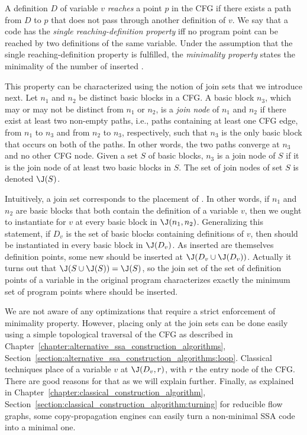 A definition $D$ of variable $v$ \emph{reaches} a point $p$ in the CFG
if there exists a path from $D$ to $p$ that does not pass through another
definition of $v$. We say that a code has the \emph{single reaching-definition property} iff no program point can be reached by two definitions of the same variable. 
Under the assumption that the single reaching-definition property is fulfilled, the \emph{minimality property} states the minimality of the number of inserted \phifuns.

This property can be characterized using the notion of join sets that we introduce next.
Let $n_{1}$ and $n_{2}$ be distinct basic blocks in a CFG. A basic block
$n_{3}$, which may or may not be distinct from $n_{1}$ or $n_{2}$, is 
a \emph{join node} of $n_{1}$ and $n_{2}$ if there exist at least two
non-empty paths, i.e., paths containing at least one CFG edge, from 
$n_{1}$ to $n_{3}$ and from $n_{2}$ to $n_{3}$, respectively, such that
$n_{3}$ is the only basic block that occurs on both of the paths. In
other words, the two paths converge at $n_{3}$ and no other CFG node. 
Given a set $S$ of basic blocks, $n_{3}$ is a join node of $S$ if it
is the join node of at least two basic blocks in $S$. The set of join
nodes of set $S$ is denoted $\J(S)$.

Intuitively, a join set corresponds to the placement of \phifuns.
In other words, if $n_{1}$ and $n_{2}$ are basic blocks that both
contain the definition of a variable $v$, then we ought to instantiate
\phifuns for $v$ at every basic block in $\J(n_{1}, n_{2})$. 
Generalizing this statement, if $D_v$ is the set of basic blocks containing
definitions of $v$, then \phifuns should be instantiated in
every basic block in $\J(D_v)$. As inserted \phifuns are themselves 
definition points, some new \phifuns should be inserted at $\J(D_v\cup\J(D_v))$. 
Actually it turns out that $\J(S\cup\J(S))=\J(S)$, so the join set of the set of definition points of a variable in the original program characterizes exactly the minimum set of program points where \phifuns should be inserted.

We are not aware of any optimizations that require a strict enforcement of minimality property.
However, placing \phifuns only at the join sets can be done easily using a simple topological traversal of the CFG as described in Chapter~\ref{chapter:alternative_ssa_construction_algorithms}, Section~\ref{section:alternative_ssa_construction_algorithms:loop}. Classical techniques place \phifuns of a variable $v$ at $\J(D_v,r)$, with $r$ the entry node of the CFG. There are good reasons for that as we will explain further. Finally, as explained in Chapter~\ref{chapter:classical_construction_algorithm}, Section~\ref{section:classical_construction_algorithm:turning} for reducible flow graphs, some copy-propagation engines can easily turn a non-minimal SSA code into a minimal one.

